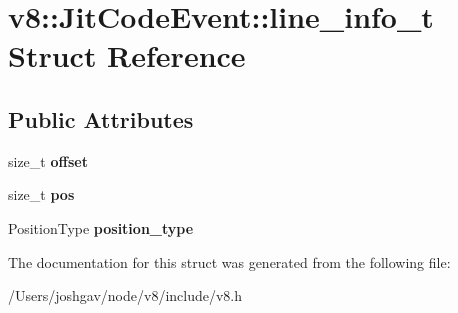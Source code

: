 \hypertarget{structv8_1_1_jit_code_event_1_1line__info__t}{}\section{v8\+:\+:Jit\+Code\+Event\+:\+:line\+\_\+info\+\_\+t Struct Reference}
\label{structv8_1_1_jit_code_event_1_1line__info__t}
\subsection*{Public Attributes}
\begin{DoxyCompactItemize}
\item 
size\+\_\+t {\bfseries offset}\hypertarget{structv8_1_1_jit_code_event_1_1line__info__t_a084f165114adc594e838ef5fe0c879d6}{}\label{structv8_1_1_jit_code_event_1_1line__info__t_a084f165114adc594e838ef5fe0c879d6}

\item 
size\+\_\+t {\bfseries pos}\hypertarget{structv8_1_1_jit_code_event_1_1line__info__t_aad9a3d593ffa9b647b31b67f60ad19f2}{}\label{structv8_1_1_jit_code_event_1_1line__info__t_aad9a3d593ffa9b647b31b67f60ad19f2}

\item 
Position\+Type {\bfseries position\+\_\+type}\hypertarget{structv8_1_1_jit_code_event_1_1line__info__t_ad8a0e551ed2b67096a3fe2f64e2b77a2}{}\label{structv8_1_1_jit_code_event_1_1line__info__t_ad8a0e551ed2b67096a3fe2f64e2b77a2}

\end{DoxyCompactItemize}


The documentation for this struct was generated from the following file\+:\begin{DoxyCompactItemize}
\item 
/\+Users/joshgav/node/v8/include/v8.\+h\end{DoxyCompactItemize}
